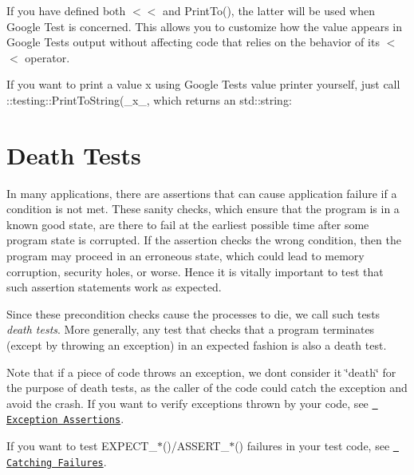 If you have defined both {\ttfamily $<$$<$} and {\ttfamily Print\+To()}, the latter will be used when Google Test is concerned. This allows you to customize how the value appears in Google Test\textquotesingle{}s output without affecting code that relies on the behavior of its {\ttfamily $<$$<$} operator.

If you want to print a value {\ttfamily x} using Google Test\textquotesingle{}s value printer yourself, just call {\ttfamily \+::testing\+::\+Print\+To\+String(}\+\_\+x\+\_\+{\ttfamily )}, which returns an {\ttfamily std\+::string}\+:


\begin{DoxyCode}{0}
\DoxyCodeLine{}
\end{DoxyCode}


\section*{Death Tests}

In many applications, there are assertions that can cause application failure if a condition is not met. These sanity checks, which ensure that the program is in a known good state, are there to fail at the earliest possible time after some program state is corrupted. If the assertion checks the wrong condition, then the program may proceed in an erroneous state, which could lead to memory corruption, security holes, or worse. Hence it is vitally important to test that such assertion statements work as expected.

Since these precondition checks cause the processes to die, we call such tests {\itshape death tests}. More generally, any test that checks that a program terminates (except by throwing an exception) in an expected fashion is also a death test.

Note that if a piece of code throws an exception, we don\textquotesingle{}t consider it \char`\"{}death\char`\"{} for the purpose of death tests, as the caller of the code could catch the exception and avoid the crash. If you want to verify exceptions thrown by your code, see \href{#exception-assertions}\texttt{ Exception Assertions}.

If you want to test {\ttfamily E\+X\+P\+E\+C\+T\+\_\+$\ast$()/\+A\+S\+S\+E\+R\+T\+\_\+$\ast$()} failures in your test code, see \href{#catching-failures}\texttt{ Catching Failures}.

